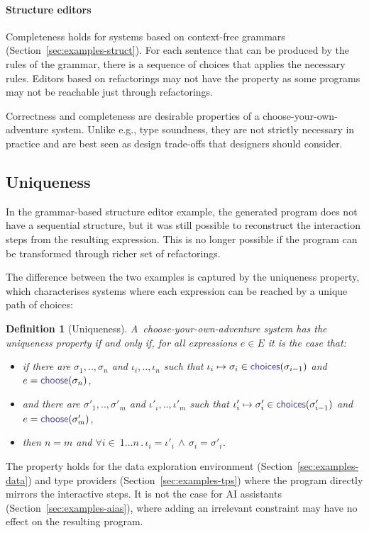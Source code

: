 \documentclass[nonacm,anonymous,sigplan,screen]{acmart}
\newcommand{\ident}[1]{\textsf{\color{DarkSlateBlue}{#1}}}
\newcommand{\select}{\textnormal{\ident{choose}}}
\newcommand{\choices}{\textnormal{\ident{choices}}}
\newcommand{\mparagraph}[1]{\vspace{-0.25em}\paragraph{#1}}
\newtheorem{definition}{Definition}
\begin{document}
\mparagraph{Structure editors}
Completeness holds for systems based on context-free grammars (Section~\ref{sec:examples-struct}).
For each sentence that can be produced by the rules of the grammar, there is a sequence of choices
that applies the necessary rules. Editors based on refactorings may not have the property as some
programs may not be reachable just through refactorings.
\vspace{0.5em}

Correctness and completeness are desirable properties of a choose-your-own-adventure
system. Unlike e.g., type soundness, they are not strictly necessary in practice and are best
seen as design trade-offs that designers should consider.

\subsection{Uniqueness}
In the grammar-based structure editor example, the generated program does not have a sequential
structure, but it was still possible to reconstruct the interaction steps from the resulting expression.
This is no longer possible if the program can be transformed through richer set of refactorings.

The difference between the two examples is captured by the uniqueness property, which characterises
systems where each expression can be reached by a unique path of choices:

\begin{definition}[Uniqueness]
A~choose-your-own-adventure system has the uniqueness property if and only if,
for all expressions $e\in E$ it is the case that:
\begin{itemize}
\item if there are $\sigma_1,..,\sigma_n$ and $\iota_i,..,\iota_n$ such that
  $\iota_i\mapsto\sigma_i \in \choices(\sigma_{i-1})$ and $e=\select(\sigma_n)$,
\item and there are $\sigma'_1,..,\sigma'_m$ and $\iota'_i,..,\iota'_m$ such that
  $\iota'_i\mapsto\sigma'_i \in \choices(\sigma'_{i-1})$ and $e=\select(\sigma'_m)$,
\item then $n=m$ and $\forall i\!\in\!\ 1\ldots n\,.\,\iota_i=\iota'_i\,\wedge\,\sigma_i=\sigma'_i$.
\end{itemize}
\end{definition}

The property holds for the data exploration environment (Section~\ref{sec:examples-data}) and
type providers (Section~\ref{sec:examples-tps}) where the program directly mirrors the interactive
steps. It is not the case for AI assistants (Section~\ref{sec:examples-aias}), where adding
an irrelevant constraint may have no effect on the resulting program.
\end{document}
